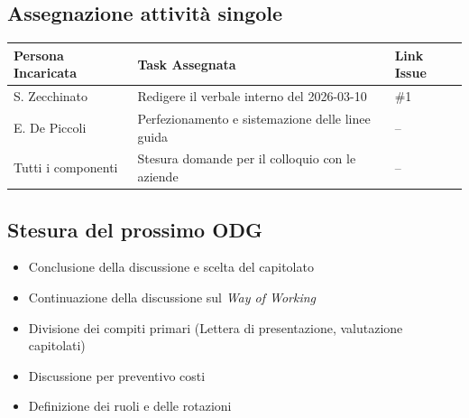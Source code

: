 \documentclass[a4paper, 10pt, colorlinks=true, linkcolor=black, urlcolor=blue, citecolor=blue, hidelinks]{article}
\begin{document}
\subsection{Assegnazione attività singole}
\begin{center}
\renewcommand{\arraystretch}{1.4}
\begin{tabular}{|p{4.2cm}|p{6.2cm}|p{2.2cm}|}
\hline
\textbf{Persona Incaricata} & \textbf{Task Assegnata} & \centering\textbf{Link Issue} \tabularnewline
\hline
S. Zecchinato & Redigere il verbale interno del 2026-03-10 & \centering \#1 \tabularnewline
\hline
E. De Piccoli & Perfezionamento e sistemazione delle linee guida & \centering  -- \tabularnewline
\hline
Tutti i componenti & Stesura domande per il colloquio con le aziende & \centering -- \tabularnewline
\hline
\end{tabular}
\end{center}

\subsection{Stesura del prossimo ODG}
\begin{itemize}
    \item Conclusione della discussione e scelta del capitolato 
    \item Continuazione della discussione sul \textit{Way of Working}
    \item Divisione dei compiti primari (Lettera di presentazione, valutazione capitolati)
    \item Discussione per preventivo costi 
    \item Definizione dei ruoli e delle rotazioni
\end{itemize}

\appendix
\end{document}
